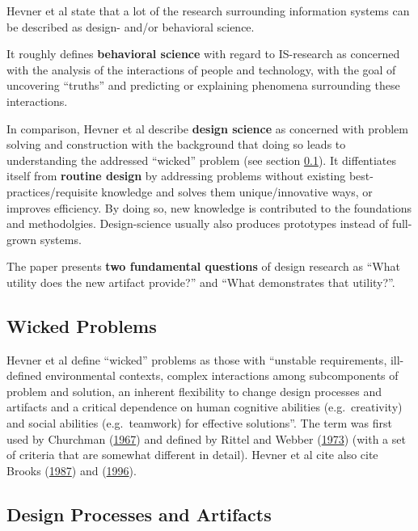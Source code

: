 \documentclass[a4paper,,tablecaptionabove]{scrbook}
\begin{document}
Hevner et al state that a lot of the research surrounding information
systems can be described as design- and/or behavioral science.

It roughly defines \textbf{behavioral science} with regard to
IS-research as concerned with the analysis of the interactions of people
and technology, with the goal of uncovering \enquote{truths} and
predicting or explaining phenomena surrounding these interactions.

In comparison, Hevner et al describe \textbf{design science} as
concerned with problem solving and construction with the background that
doing so leads to understanding the addressed \enquote{wicked} problem
(see section \ref{sec:wicked}). It diffentiates itself from
\textbf{routine design} by addressing problems without existing
best-practices/requisite knowledge and solves them unique/innovative
ways, or improves efficiency. By doing so, new knowledge is contributed
to the foundations and methodolgies. Design-science usually also
produces prototypes instead of full-grown systems.

The paper presents \textbf{two fundamental questions} of design research
as \enquote{What utility does the new artifact provide?} and
\enquote{What demonstrates that utility?}.

\hypertarget{sec:wicked}{%
\subsection{Wicked Problems}\label{sec:wicked}}

Hevner et al define \enquote{wicked} problems as those with
\enquote{unstable requirements, ill-defined environmental contexts,
complex interactions among subcomponents of problem and solution, an
inherent flexibility to change design processes and artifacts and a
critical dependence on human cognitive abilities (e.g.~creativity) and
social abilities (e.g.~teamwork) for effective solutions}. The term was
first used by Churchman
(\protect\hyperlink{ref-ChurchmanGuesteditorialWicked1967a}{1967}) and
defined by Rittel and Webber
(\protect\hyperlink{ref-RittelDilemmasgeneraltheory1973}{1973}) (with a
set of criteria that are somewhat different in detail). Hevner et al
cite also cite Brooks
(\protect\hyperlink{ref-BrooksNoSilverBullet1987}{1987}) and
(\protect\hyperlink{ref-BrooksComputerScientistToolsmith1996}{1996}).

\hypertarget{sec:des-proc-and-artifacts}{%
\subsection{Design Processes and
Artifacts}\label{sec:des-proc-and-artifacts}}
\end{document}
